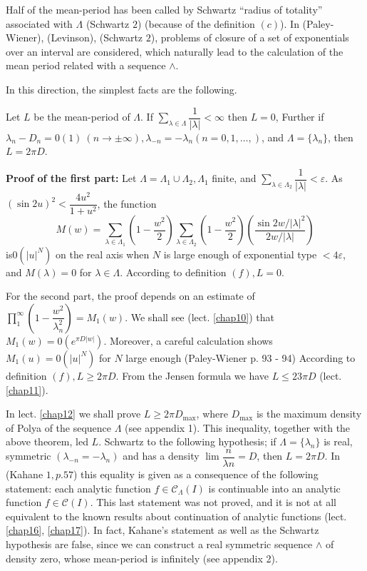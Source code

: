 Half of the mean-period has been called by Schwartz ``radius of
totality'' associated with $\Lambda$ (Schwartz $2$) (because of the
definition $(c)$). In (Paley-Wiener), (Levinson), (Schwartz $2$),
problems of closure of a set of exponentials over an interval are
considered, which naturally lead to the calculation of the mean period
related with a sequence $\wedge$. 

In this direction, the simplest facts are the following.
\begin{theorem*}%
 Let $L$ be the mean-period of $\Lambda$. If $\sum\limits_{\lambda
 \in \Lambda}\dfrac{1}{|\lambda|} < \infty$ then $L = 0$, Further
 if $\lambda_n - D_n = 0 (1) ~ (n \to \pm \infty), \lambda_{-n} =
 -\lambda_n (n = 0, 1, \ldots,)$, and $\Lambda = \{\lambda_n \}$,
 then $L = 2 \pi D$. 
\end{theorem*}

\noindent \textbf{Proof of the first part:} Let $\Lambda = \Lambda_1 \cup
\Lambda_2, \Lambda_1$ finite, and $\sum\limits_{\lambda \in
 \Lambda_2}\dfrac{1}{|\lambda|}<\varepsilon$. As $(\sin 2u)^2 <
\dfrac{4u^2}{1+u^2}$, the function 
$$
M(w) = \sum_{\lambda \in \Lambda_1}\left(1-\frac{w^2}{2}\right)\sum_{\lambda \in
 \Lambda_2}\left(1-\frac{w^2}{2}\right) \left(\frac{\sin 2w / |
 \lambda |^2}{2w / | \lambda |}\right) 
$$
is\pageoriginale $0(|u|^N)$ on the real axis when $N$ is large enough of exponential
type $ < 4 \varepsilon$, and $M(\lambda) = 0$ for $\lambda \in
\Lambda$. According to definition $(f), L = 0$. 

For the second part, the proof depends on an estimate of
$\prod\limits_1^\infty (1-\dfrac{w^2}{\lambda_n^2}) = M_1 (w)$. We
shall see (lect. \ref{chap10}) that $M_1 (w) = 0(e^{\pi D |w|})$. Moreover, a
careful calculation shows $M_1(u) = 0(|u|^N)$ for $N$ large enough
(Paley-Wiener p. 93 - 94) According to definition $(f), L\geq 2 \pi
D$. From the Jensen formula we have $L \leq 23 \pi D$ (lect. \ref{chap11}). 

In lect. \ref{chap12} we shall prove $L \geq 2 \pi D_{\max}$, where $D_{\max}$
is the maximum density of Polya of the sequence $\Lambda$ (see
appendix 1). This inequality, together with the above theorem, led
$L$. Schwartz to the following hypothesis; if $\Lambda =
\{\lambda_n\}$ is real, symmetric $(\lambda_{-n} = -\lambda_n)$ and
has a density $\lim \dfrac{n}{\lambda n} = D$, then $L = 2 \pi D$. In
(Kahane $1, p. 57$) this equality is given as a consequence of the
following statement: each analytic function $f \in \mathscr{C}_{\Lambda}
(I)$ is continuable into an analytic function $f \in
\mathscr{C}(I)$. This last statement was not proved, and it is not at
all equivalent to the known results about continuation of analytic
functions (lect. \ref{chap16}, \ref{chap17}). In fact, Kahane's statement as well as the
Schwartz hypothesis are false, since we can construct a real symmetric
sequence $\wedge$ of density zero, whose mean-period is infinitely (see
appendix 2). 

